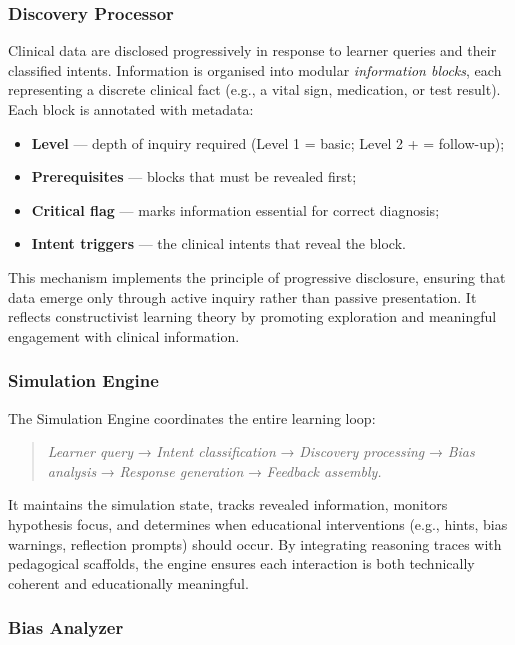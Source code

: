 \subsubsection{Discovery Processor}

Clinical data are disclosed progressively in response to learner queries and
their classified intents.  
Information is organised into modular \textit{information blocks}, each
representing a discrete clinical fact (e.g., a vital sign, medication, or test
result).  
Each block is annotated with metadata:

\begin{itemize}
  \item \textbf{Level} — depth of inquiry required
  (Level 1 = basic; Level 2 + = follow-up);
  \item \textbf{Prerequisites} — blocks that must be revealed first;
  \item \textbf{Critical flag} — marks information essential for correct
  diagnosis;
  \item \textbf{Intent triggers} — the clinical intents that reveal the block.
\end{itemize}

This mechanism implements the principle of progressive disclosure, ensuring that
data emerge only through active inquiry rather than passive presentation.  
It reflects constructivist learning theory by promoting exploration and
meaningful engagement with clinical information.

\subsubsection{Simulation Engine}

The Simulation Engine coordinates the entire learning loop:

\begin{quote}
\textit{Learner query} → \textit{Intent classification} → \textit{Discovery
processing} → \textit{Bias analysis} → \textit{Response generation} →
\textit{Feedback assembly.}
\end{quote}

It maintains the simulation state, tracks revealed information, monitors
hypothesis focus, and determines when educational interventions (e.g., hints,
bias warnings, reflection prompts) should occur.  
By integrating reasoning traces with pedagogical scaffolds, the engine ensures
each interaction is both technically coherent and educationally meaningful.

\subsubsection{Bias Analyzer}

